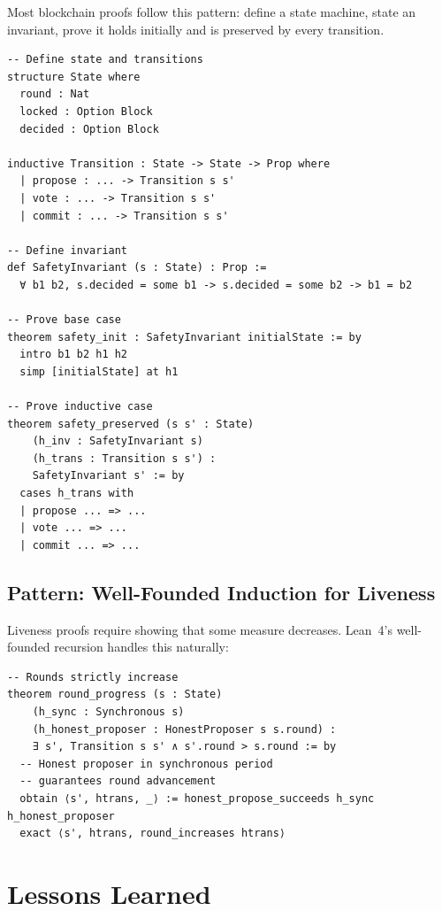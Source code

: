 \documentclass[11pt,a4paper]{article}
\begin{document}
Most blockchain proofs follow this pattern: define a state machine, state an invariant,
prove it holds initially and is preserved by every transition.

\begin{lstlisting}[language=Lean,caption={State machine invariant pattern}]
-- Define state and transitions
structure State where
  round : Nat
  locked : Option Block
  decided : Option Block

inductive Transition : State -> State -> Prop where
  | propose : ... -> Transition s s'
  | vote : ... -> Transition s s'
  | commit : ... -> Transition s s'

-- Define invariant
def SafetyInvariant (s : State) : Prop :=
  ∀ b1 b2, s.decided = some b1 -> s.decided = some b2 -> b1 = b2

-- Prove base case
theorem safety_init : SafetyInvariant initialState := by
  intro b1 b2 h1 h2
  simp [initialState] at h1

-- Prove inductive case
theorem safety_preserved (s s' : State)
    (h_inv : SafetyInvariant s)
    (h_trans : Transition s s') :
    SafetyInvariant s' := by
  cases h_trans with
  | propose ... => ...
  | vote ... => ...
  | commit ... => ...
\end{lstlisting}

\subsection{Pattern: Well-Founded Induction for Liveness}

Liveness proofs require showing that some measure decreases. Lean~4's well-founded
recursion handles this naturally:

\begin{lstlisting}[language=Lean,caption={Well-founded liveness argument}]
-- Rounds strictly increase
theorem round_progress (s : State)
    (h_sync : Synchronous s)
    (h_honest_proposer : HonestProposer s s.round) :
    ∃ s', Transition s s' ∧ s'.round > s.round := by
  -- Honest proposer in synchronous period
  -- guarantees round advancement
  obtain ⟨s', htrans, _⟩ := honest_propose_succeeds h_sync h_honest_proposer
  exact ⟨s', htrans, round_increases htrans⟩
\end{lstlisting}

\section{Lessons Learned}
\end{document}
